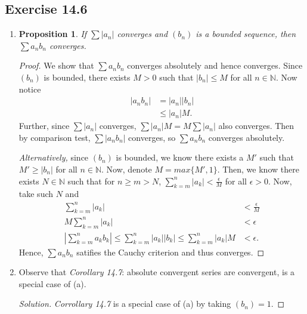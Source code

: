 \documentclass{article}
\newtheorem{proposition}[thm]{Proposition}
\begin{document}
\subsection*{Exercise 14.6}
\begin{enumerate}[label=(\alph*)]
    \item 
    \begin{proposition}
        If $\sum|a_n|$ converges and $(b_n)$ is a bounded sequence, then $\sum a_nb_n$ converges.
    \end{proposition}
    \begin{proof}
        We show that $\sum a_nb_n$ converges absolutely and hence converges. Since $(b_n)$ is bounded,
        there exists $M>0$ such that $|b_n|\le M$ for all $n\in\mathbb{N}$. Now notice
        \begin{align*}
            |a_nb_n| & = |a_n||b_n| \\
            & \le |a_n|M.
        \end{align*}
        Further, since $\sum |a_n|$ converges, $\sum |a_n|M = M\sum |a_n|$ also converges. Then by
        comparison test, $\sum |a_nb_n|$ converges, so $\sum a_nb_n$ converges absolutely.

        \emph{Alternatively,} since $(b_n)$ is bounded, we know there exists a $M'$ such that 
        $M' \ge |b_n|$ for all $n\in\mathbb{N}$. Now, denote
        $M = max\{M',1\}$. Then, we know there exists $N\in\mathbb{N}$ such that for $n\ge m>N$, 
        $\sum_{k=m}^n|a_k|<\frac{\epsilon}{M}$ for all $\epsilon>0$. Now, take such $N$ and
        \begin{align*}
            \sum_{k=m}^n|a_k| & < \frac{\epsilon}{M} \\
            M\sum_{k=m}^{n}|a_k| & < \epsilon \\
            \left|\sum_{k=m}^{n}a_kb_k\right| \le \sum_{k=m}^{n}|a_k||b_k| \le \sum_{k=m}^{n}|a_k|M & < \epsilon.
        \end{align*}
        Hence, $\sum a_nb_n$ satifies the Cauchy criterion and thus converges.
    \end{proof}

    \item Observe that \emph{Corollary 14.7}: absolute convergent series are convergent, is a 
    special case of (a).
    \begin{proof}[Solution]
        \emph{Corrollary 14.7} is a special case of (a) by taking $(b_n)=1$.
    \end{proof}
\end{enumerate}
\end{document}
